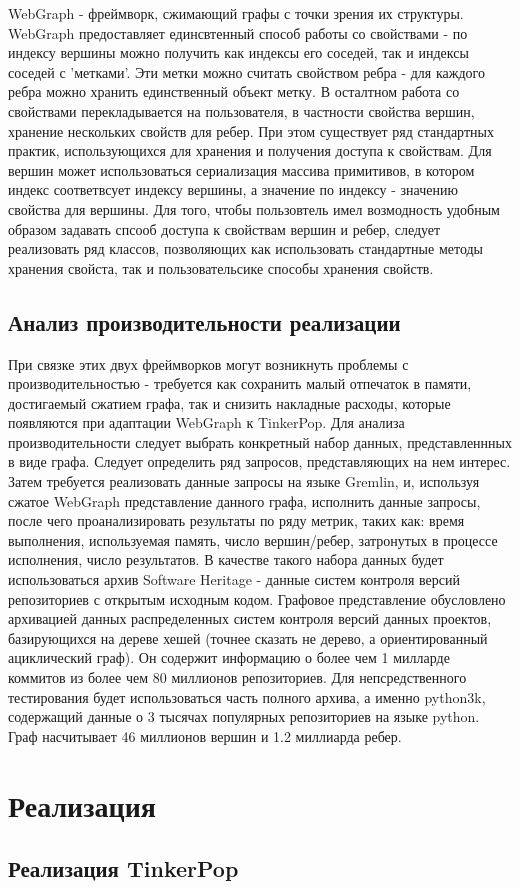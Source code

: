 \documentclass[times,specification,annotation]{itmo-student-thesis}
\begin{document}
WebGraph - фреймворк, сжимающий графы с точки зрения их структуры. WebGraph предоставляет единсвтенный способ работы со свойствами - по индексу вершины можно получить как индексы его соседей, так и индексы соседей с 'метками'. Эти метки можно считать свойством ребра - для каждого ребра можно хранить единственный объект метку. В осталтном работа со свойствами перекладывается на пользователя, в частности свойства вершин, хранение нескольких свойств для ребер.
При этом существует ряд стандартных практик, использующихся для хранения и получения доступа к свойствам. Для вершин может использоваться сериализация массива примитивов, в котором индекс соответвсует индексу вершины, а значение по индексу - значению свойства для вершины. Для того, чтобы пользовтель имел возмодность удобным образом задавать спсооб доступа к свойствам вершин и ребер, следует реализовать ряд классов, позволяющих как использовать стандартные методы хранения свойста, так и пользовательсике способы хранения свойств.

\section{Анализ производительности реализации}

При связке этих двух фреймворков могут возникнуть проблемы с производительностью - требуется как сохранить малый отпечаток в памяти, достигаемый сжатием графа, так и снизить накладные расходы, которые появляются при адаптации WebGraph к TinkerPop.
Для анализа производительности следует выбрать конкретный набор данных, представленнных в виде графа. Следует определить ряд запросов, представляющих на нем интерес. Затем требуется реализовать данные запросы на языке Gremlin, и, используя сжатое WebGraph представление данного графа, исполнить данные запросы, после чего проанализировать результаты по ряду метрик, таких как: время выполнения, используемая память, число вершин/ребер, затронутых в процессе исполнения, число результатов.
В качестве такого набора данных будет использоваться архив Software Heritage - данные систем контроля версий репозиториев с открытым исходным кодом. Графовое представление обусловлено архивацией данных распределенных систем контроля версий данных проектов, базирующихся на дереве хешей (точнее сказать не дерево, а ориентированный ациклический граф). Он содержит информацию о более чем 1 милларде коммитов из более чем 80 миллионов репозиториев. Для непсредственного тестирования будет использоваться часть полного архива, а именно python3k, содержащий данные о 3 тысячах популярных репозиториев на языке python. Граф насчитывает 46 миллионов вершин и 1.2 миллиарда ребер.

\chapter{Реализация}

\section{Реализация TinkerPop}

\printmainbibliography
\end{document}
